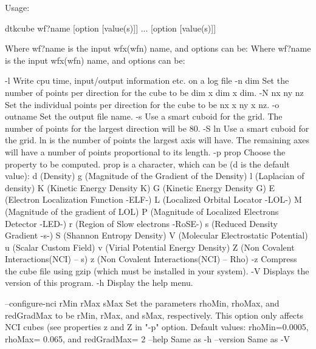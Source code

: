 Usage:

	dtkcube wf?name [option [value(s)]] ... [option [value(s)]]

Where wf?name is the input wfx(wfn) name, and options can be:
Where wf?name is the input wfx(wfn) name, and options can be:

  -l        	Write cpu time, input/output information etc. on a log file
  -n  dim   	Set the number of points per direction for the cube
            	  to be dim x dim x dim.
  -N nx ny nz	Set the individual points per direction for the cube
            	  to be nx x ny x nz.
  -o outname	Set the output file name.
  -s        	Use a smart cuboid for the grid. The number of points for the
            	  largest direction will be 80.
  -S ln     	Use a smart cuboid for the grid. ln is the number of points
            	  the largest axis will have. The remaining axes will have
            	  a number of points proportional to its length.
  -p prop	Choose the property to be computed. prop is a character,
         	  which can be (d is the default value): 
         		d (Density)
         		g (Magnitude of the Gradient of the Density)
         		l (Laplacian of density)
         		K (Kinetic Energy Density K)
         		G (Kinetic Energy Density G)
         		E (Electron Localization Function -ELF-)
         		L (Localized Orbital Locator -LOL-)
         		M (Magnitude of the gradient of LOL)
         		P (Magnitude of Localized Electrons Detector -LED-)
         		r (Region of Slow electrons -RoSE-)
         		s (Reduced Density Gradient -s-)
         		S (Shannon Entropy Density)
         		V (Molecular Electrostatic Potential)
         		u (Scalar Custom Field)
         		v (Virial Potential Energy Density)
         		Z (Non Covalent Interactions(NCI) -- s)
         		z (Non Covalent Interactions(NCI) -- Rho)
  -z     	Compress the cube file using gzip (which must be installed
         	   in your system).
  -V        	Displays the version of this program.
  -h		Display the help menu.

  --configure-nci rMin rMax sMax 	Set the parameters rhoMin, rhoMax,
             		  and redGradMax to be rMin, rMax, and sMax, respectively.
             		  This option only affects NCI cubes (see properties z and
             		  Z in "-p" option. Default values: rhoMin=0.0005,
             		  rhoMax= 0.065, and redGradMax= 2
  --help    		Same as -h
  --version 		Same as -V
